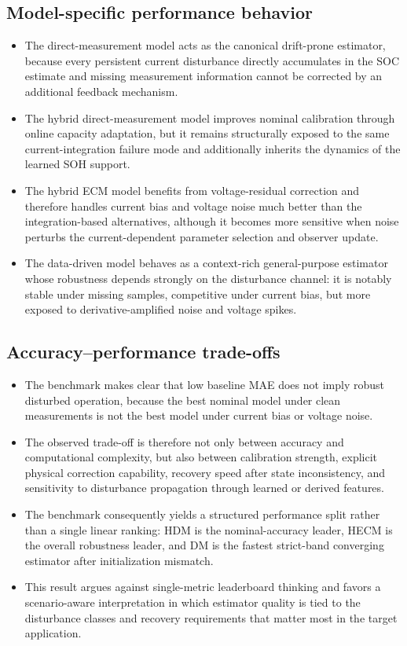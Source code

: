 \documentclass[review,nopreprintline]{elsarticle}
\begin{document}
\subsection{Model-specific performance behavior}
\begin{itemize}[leftmargin=*]
    \item The direct-measurement model acts as the canonical drift-prone estimator, because every persistent current disturbance directly accumulates in the SOC estimate and missing measurement information cannot be corrected by an additional feedback mechanism.
    \item The hybrid direct-measurement model improves nominal calibration through online capacity adaptation, but it remains structurally exposed to the same current-integration failure mode and additionally inherits the dynamics of the learned SOH support.
    \item The hybrid ECM model benefits from voltage-residual correction and therefore handles current bias and voltage noise much better than the integration-based alternatives, although it becomes more sensitive when noise perturbs the current-dependent parameter selection and observer update.
    \item The data-driven model behaves as a context-rich general-purpose estimator whose robustness depends strongly on the disturbance channel: it is notably stable under missing samples, competitive under current bias, but more exposed to derivative-amplified noise and voltage spikes.
\end{itemize}

\subsection{Accuracy--performance trade-offs}
\begin{itemize}[leftmargin=*]
    \item The benchmark makes clear that low baseline MAE does not imply robust disturbed operation, because the best nominal model under clean measurements is not the best model under current bias or voltage noise.
    \item The observed trade-off is therefore not only between accuracy and computational complexity, but also between calibration strength, explicit physical correction capability, recovery speed after state inconsistency, and sensitivity to disturbance propagation through learned or derived features.
    \item The benchmark consequently yields a structured performance split rather than a single linear ranking: HDM is the nominal-accuracy leader, HECM is the overall robustness leader, and DM is the fastest strict-band converging estimator after initialization mismatch.
    \item This result argues against single-metric leaderboard thinking and favors a scenario-aware interpretation in which estimator quality is tied to the disturbance classes and recovery requirements that matter most in the target application.
\end{itemize}
\end{document}
